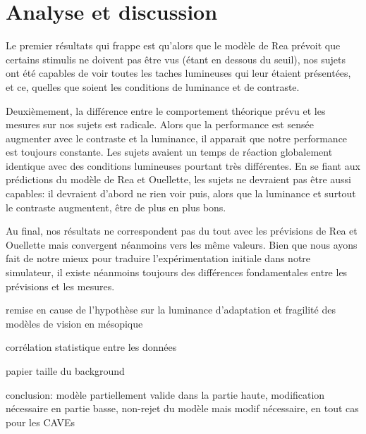 	\section{Analyse et discussion}
	\par Le premier résultats qui frappe est qu'alors que le modèle de Rea prévoit que certains stimulis ne doivent pas être vus (étant en dessous du seuil), nos sujets ont été capables de voir toutes les taches lumineuses qui leur étaient présentées, et ce, quelles que soient les conditions de luminance et de contraste.
	
	\par Deuxièmement, la différence entre le comportement théorique prévu et les mesures sur nos sujets est radicale. Alors que la performance est sensée augmenter avec le contraste et la luminance, il apparait que notre performance est toujours constante. Les sujets avaient un temps de réaction globalement identique avec des conditions lumineuses pourtant très différentes. En se fiant aux prédictions du modèle de Rea et Ouellette, les sujets ne devraient pas être aussi capables: il devraient d'abord ne rien voir puis, alors que la luminance et surtout le contraste augmentent, être de plus en plus bons.
	
	\par Au final, nos résultats ne correspondent pas du tout avec les prévisions de Rea et Ouellette mais convergent néanmoins vers les même valeurs. Bien que nous ayons fait de notre mieux pour traduire l'expérimentation initiale dans notre simulateur, il existe néanmoins toujours des différences fondamentales entre les prévisions et les mesures.
	
	\par remise en cause de l'hypothèse sur la luminance d'adaptation et fragilité des modèles de vision en mésopique
	
	\par corrélation statistique entre les données
	
	\par papier taille du background
	
	\par conclusion: modèle partiellement valide dans la partie haute, modification nécessaire en partie basse, non-rejet du modèle mais modif nécessaire, en tout cas pour les CAVEs
